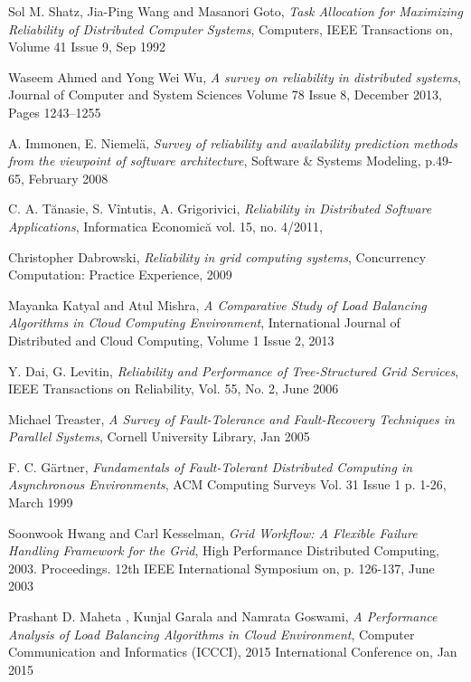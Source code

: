 \documentclass{cslthse-msc}
\begin{document}
\begin{thebibliography}{50}

	Sol M. Shatz, Jia-Ping Wang and Masanori Goto,
	\emph{Task Allocation for Maximizing Reliability of Distributed Computer Systems},
	Computers, IEEE Transactions on, Volume 41 Issue 9,
	Sep 1992
	
	Waseem Ahmed and Yong Wei Wu,
	\emph{A survey on reliability in distributed systems},
	Journal of Computer and System Sciences Volume 78 Issue 8,
	December 2013, Pages 1243–1255
	
	A. Immonen, E. Niemelä,
	\emph{Survey of reliability and availability prediction methods from the viewpoint of software architecture},
	Software \& Systems Modeling, p.49-65,
	February 2008

	C. A. Tănasie, S. Vîntutis, A. Grigorivici,
	\emph{Reliability in Distributed Software Applications},
	Informatica Economică vol. 15, no. 4/2011,

	Christopher Dabrowski,
	\emph{Reliability in grid computing systems},
	Concurrency Computation: Practice Experience,
	2009

	Mayanka Katyal and Atul Mishra,
	\emph{A Comparative Study of Load Balancing Algorithms in Cloud Computing Environment},
	International Journal of Distributed and Cloud Computing, Volume 1 Issue 2,
	2013
	
	Y. Dai, G. Levitin,
	\emph{Reliability and Performance of Tree-Structured Grid Services},
	IEEE Transactions on Reliability, Vol. 55, No. 2, 
	June 2006

	Michael Treaster,
	\emph{A Survey of Fault-Tolerance and Fault-Recovery Techniques in Parallel Systems},
	Cornell University Library,
	Jan 2005

	F. C. Gärtner,
	\emph{Fundamentals of Fault-Tolerant Distributed Computing in Asynchronous Environments},
	ACM Computing Surveys Vol. 31 Issue 1 p. 1-26, 
	March 1999 

	Soonwook Hwang and Carl Kesselman,
	\emph{Grid Workflow: A Flexible Failure Handling Framework for the Grid},
	High Performance Distributed Computing, 2003. Proceedings. 12th IEEE International Symposium on, p. 	126-137, 
	June 2003

	Prashant D. Maheta , Kunjal Garala and Namrata Goswami,
	\emph{A Performance Analysis of Load Balancing Algorithms in Cloud Environment},
	Computer Communication and Informatics (ICCCI), 2015 International Conference on,
	Jan 2015
	

\end{thebibliography}
\end{document}

